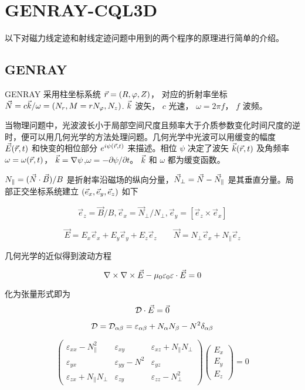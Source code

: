 
\chapter{GENRAY-CQL3D}
以下对磁力线定迹和射线定迹问题中用到的两个程序的原理进行简单的介绍。
\section{GENRAY}
GENRAY 采用柱坐标系统 $\vec{r}=(R, \varphi, Z)$， 对应的折射率坐标 $\vec{N} = c\vec{k}/\omega = (N_r, M= rN_\varphi, N_z)$. $\vec{k}$ 波矢， $c$ 光速， $\omega = 2\pi f$， $f$ 波频。


当物理问题中，光波波长小于局部空间尺度且频率大于介质参数变化时间尺度的逆时，便可以用几何光学的方法处理问题。几何光学中光波可以用缓变的幅度 $\vec{E}(\vec{r},t)$ 和快变的相位部分 $e^{i\psi(\vec{r},t)}$ 来描述。相位 $\psi$ 决定了波矢 $\vec{k}(\vec{r},t)$ 及角频率 $\omega = \omega(\vec{r},t)$， $\vec{k} =\nabla \psi$,$\omega=-\partial \psi/\partial t$。 $\vec{k}$ 和 $\omega$ 都为缓变函数。

$N_{\parallel}=(\vec{N} \cdot \vec{B}) / B$ 是折射率沿磁场的纵向分量，$\vec{N}_{\perp}=\vec{N}-\vec{N}_{\parallel}$ 是其垂直分量。局部正交坐标系统建立 $(\vec{e}_x,\vec{e}_y,\vec{e}_z)$ 如下


\begin{equation*}\vec{e}_{z}=\vec{B}/B, \vec{e}_{x}=\vec{N}_{\perp}/N_{\perp}, \vec{e}_{y}=\left[\vec{e}_{z} \times \vec{e}_{x}\right]\end{equation*}

  
$$\vec{E}=E_{x} \vec{e}_{x}+E_{y} \vec{e}_{y}+E_{z} \vec{e}_{z} \qquad \vec{N}=N_{\perp} \vec{e}_{x}+N_{\parallel} \vec{e}_{z}$$


几何光学的近似得到波动方程

\begin{equation}\nabla \times \nabla \times \vec{E}-\mu_0\varepsilon_0 \mathcal{\varepsilon} \cdot \vec{E}=0\end{equation}

化为张量形式即为
\begin{equation}
  \mathcal{D} \cdot \vec{E}=\vec{0}
\end{equation}

$$\mathcal{D}=\mathcal{D}_{\alpha \beta}=\varepsilon_{\alpha \beta}+N_{\alpha} N_{\beta}-N^{2} \delta_{\alpha \beta}$$

\begin{equation}\left(\begin{array}{ccc}
  \varepsilon_{x x}-N_{\|}^{2} & \varepsilon_{x y} & \varepsilon_{x z}+N_{\|} N_{\perp} \\
  \varepsilon_{y x} & \varepsilon_{y y}-N^{2} & \varepsilon_{y z} \\
  \varepsilon_{z x}+N_{\|} N_{\perp} & \varepsilon_{z y} & \varepsilon_{z z}-N_{\perp}^{2}
  \end{array}\right)\left(\begin{array}{c}
  E_{x} \\
  E_{y} \\
  E_{z}
\end{array}\right)=0\end{equation}

